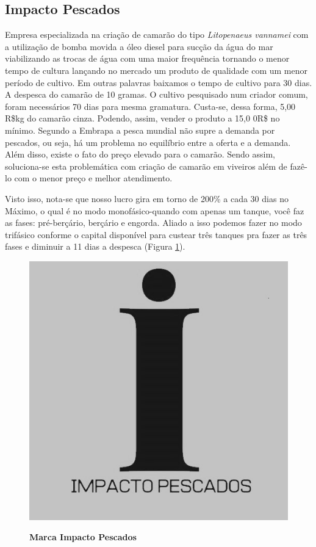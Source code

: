 \subsection{Impacto Pescados}

Empresa especializada na criação de camarão do tipo \textit{Litopenaeus vannamei} com a utilização de bomba movida a óleo diesel para sucção da água do mar viabilizando as trocas de água com uma maior frequência tornando o menor tempo de cultura lançando no mercado um produto de qualidade com um menor período de cultivo. Em outras palavras baixamos o tempo de cultivo para 30 dias. A despesca do camarão de 10 gramas. O cultivo pesquisado num criador comum, foram necessários 70 dias para mesma gramatura. Custa-se, dessa forma, 5,00 R\$kg do camarão cinza. Podendo, assim, vender o produto a 15,0 0R\$ no mínimo. Segundo a Embrapa a pesca mundial não supre a demanda por pescados, ou seja, há um problema no equilíbrio entre a oferta e a demanda. Além disso, existe o fato do preço elevado para o camarão. Sendo assim, soluciona-se esta problemática com criação de camarão em viveiros além de fazê-lo com o menor preço e melhor atendimento.

Visto isso, nota-se que nosso lucro gira em torno de 200\% a cada 30 dias no Máximo, o qual é no modo monofásico-quando com apenas um tanque, você faz as fases: pré-berçário, berçário e engorda. Aliado a isso podemos fazer no modo trifásico conforme o capital disponível para custear três tanques pra fazer as três fases e diminuir a 11 dias a despesca (Figura \ref{figura_23}).

\begin{figure}[H]
\centering
\caption{\textbf{Marca Impacto Pescados}}
\includegraphics[scale=0.4]{Imagens/imacto_pescados.jpg}
\label{figura_23}
\end{figure}


